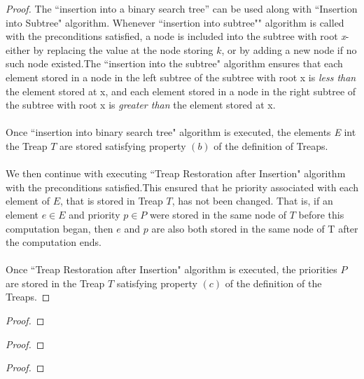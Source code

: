 \documentclass[12pt]{article}
\newenvironment{problem}[2][Problem]{\begin{trivlist}
\item[\hskip \labelsep {\bfseries #1}\hskip \labelsep {\bfseries #2.}]}{\end{trivlist}}
\begin{document}
\begin{proof}
The ``insertion into a binary search tree'' can be used along with ``Insertion into Subtree" algorithm. Whenever ``insertion into subtree"" algorithm is called with the preconditions satisfied, a node is included into the subtree with root \emph{x}- either by replacing the value at the node storing $k$, or by adding a new node if no such node existed.The ``insertion into the subtree" algorithm ensures that each element stored in a node in the left subtree of the subtree with root x is \emph{less than} the element stored at x, and each element stored in a node in the
right subtree of the subtree with root x is \emph{greater than} the element stored at x. 
\\ \\
Once ``insertion into binary search tree" algorithm is executed, the elements \emph{E} int the Treap $T$ are stored satisfying property $(b)$ of the definition of Treaps.
\\ \\
We then continue with executing ``Treap Restoration after Insertion" algorithm with the preconditions satisfied.This ensured that he priority associated with each element of $E$, that is stored in Treap $T$, has not been changed. That is, if an element $e \in E$ and priority $p \in P$ were stored in the same node of $T$ before this computation began, then $e$ and $p$ are also both stored in the same node of T after the computation ends.
\\ \\
Once ``Treap Restoration after Insertion" algorithm is executed, the priorities $P$ are stored in the Treap $T$ satisfying property $(c)$ of the definition of the Treaps.
\end{proof}



\begin{problem}{2}

\end{problem}

\begin{proof}

\end{proof}



\begin{problem}{3}

\end{problem}

\begin{proof}

\end{proof}



\begin{problem}{4}

\end{problem}

\begin{proof}

\end{proof}
\end{document}

